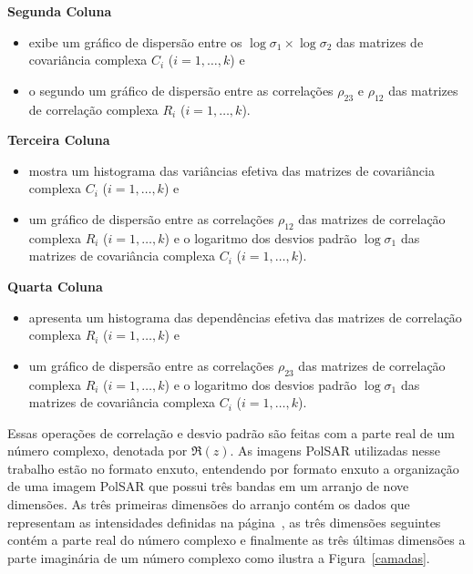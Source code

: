 \documentclass[a4paper,12pt]{article}
\begin{document}
\begin{flushleft}
\textbf{Segunda Coluna} \label{estatisticas_utilizadas}
\end{flushleft}

\begin{itemize}
\item exibe um gráfico de dispersão entre os $\log\sigma_{1}\times \log\sigma_{2}$ das matrizes de covariância complexa $C_{i}$ ($i=1,\ldots,k$) e
\item o segundo um gráfico de dispersão entre as correlações $\rho_{23}$ e $\rho_{12}$ das matrizes de correlação complexa $R_{i}$ ($i=1,\ldots,k$).
\end{itemize}

\begin{flushleft}
\textbf{Terceira Coluna}
\end{flushleft}

\begin{itemize}
\item mostra um histograma das variâncias efetiva das matrizes de covariância complexa $C_{i}$ ($i=1,\ldots,k$) e
\item um gráfico de dispersão entre as correlações $\rho_{12}$ das matrizes de correlação complexa $R_{i}$ ($i=1,\ldots,k$) e o logaritmo dos desvios padrão $\log\sigma_{1}$ das matrizes de covariância complexa $C_{i}$ ($i=1,\ldots,k$).
\end{itemize}

\begin{flushleft}
\textbf{Quarta Coluna}
\end{flushleft}

\begin{itemize}
\item apresenta um histograma das dependências efetiva das matrizes de correlação complexa $R_{i}$ ($i=1,\ldots,k$) e
\item um gráfico de dispersão entre as correlações $\rho_{23}$ das matrizes de correlação complexa $R_{i}$ ($i=1,\ldots,k$) e o logaritmo dos desvios padrão $\log\sigma_{1}$ das matrizes de covariância complexa $C_{i}$ ($i=1,\ldots,k$).
\end{itemize}

Essas operações de correlação e desvio padrão são feitas com a parte real de um número complexo, denotada por $\Re(z)$. As imagens Pol{SAR} utilizadas nesse trabalho estão no formato enxuto, entendendo por formato enxuto a organização de uma imagem PolSAR que possui três bandas em um arranjo de nove dimensões. As três primeiras dimensões do arranjo contém os dados que representam as intensidades definidas na página~\pageref{intensidades}, as três dimensões seguintes contém a parte real do número complexo e finalmente as três últimas dimensões a parte imaginária de um número complexo como ilustra a Figura~\ref{camadas}.
\end{document}
